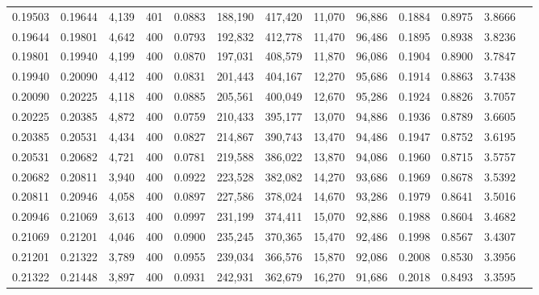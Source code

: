 \begin{tabular}{rrrrrrrrrrrrr}
0.19503 & 0.19644 &  4,139 & 401 &                                     0.0883 & 188,190 & 417,420 &  11,070 &  96,886 & 0.1884 & 0.8975 & 3.8666 \\
0.19644 & 0.19801 &  4,642 & 400 &                                     0.0793 & 192,832 & 412,778 &  11,470 &  96,486 & 0.1895 & 0.8938 & 3.8236 \\
0.19801 & 0.19940 &  4,199 & 400 &                                     0.0870 & 197,031 & 408,579 &  11,870 &  96,086 & 0.1904 & 0.8900 & 3.7847 \\
0.19940 & 0.20090 &  4,412 & 400 &                                     0.0831 & 201,443 & 404,167 &  12,270 &  95,686 & 0.1914 & 0.8863 & 3.7438 \\
0.20090 & 0.20225 &  4,118 & 400 &                                     0.0885 & 205,561 & 400,049 &  12,670 &  95,286 & 0.1924 & 0.8826 & 3.7057 \\
0.20225 & 0.20385 &  4,872 & 400 &                                     0.0759 & 210,433 & 395,177 &  13,070 &  94,886 & 0.1936 & 0.8789 & 3.6605 \\
0.20385 & 0.20531 &  4,434 & 400 &                                     0.0827 & 214,867 & 390,743 &  13,470 &  94,486 & 0.1947 & 0.8752 & 3.6195 \\
0.20531 & 0.20682 &  4,721 & 400 &                                     0.0781 & 219,588 & 386,022 &  13,870 &  94,086 & 0.1960 & 0.8715 & 3.5757 \\
0.20682 & 0.20811 &  3,940 & 400 &                                     0.0922 & 223,528 & 382,082 &  14,270 &  93,686 & 0.1969 & 0.8678 & 3.5392 \\
0.20811 & 0.20946 &  4,058 & 400 &                                     0.0897 & 227,586 & 378,024 &  14,670 &  93,286 & 0.1979 & 0.8641 & 3.5016 \\
0.20946 & 0.21069 &  3,613 & 400 &                                     0.0997 & 231,199 & 374,411 &  15,070 &  92,886 & 0.1988 & 0.8604 & 3.4682 \\
0.21069 & 0.21201 &  4,046 & 400 &                                     0.0900 & 235,245 & 370,365 &  15,470 &  92,486 & 0.1998 & 0.8567 & 3.4307 \\
0.21201 & 0.21322 &  3,789 & 400 &                                     0.0955 & 239,034 & 366,576 &  15,870 &  92,086 & 0.2008 & 0.8530 & 3.3956 \\
0.21322 & 0.21448 &  3,897 & 400 &                                     0.0931 & 242,931 & 362,679 &  16,270 &  91,686 & 0.2018 & 0.8493 & 3.3595 \\

\end{tabular}
